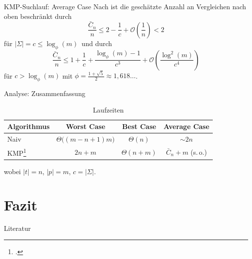 \documentclass[xcolor=dvipsnames, aspectratio=169]{beamer}
\begin{document}
\begin{frame}{KMP-Suchlauf: Average Case}
Nach \cite{baeza1989} ist die geschätzte Anzahl an Vergleichen nach oben beschränkt durch
\[\frac{\bar{C}_n}{n}\leq 2-\frac{1}{c}+\mathcal{O}\left(\frac{1}{n}\right)<2\]
für $\vert\Sigma\vert=c\leq \log_\phi(m)$\pause\ und durch
\[\frac{\bar{C}_n}{n}\leq 1+\frac{1}{c}+\frac{\log_\phi(m)-1}{c^3}+\mathcal{O}\left(\frac{\log^2(m)}{c^4}\right)\]
für $c > \log_\phi(m)$ mit $\phi=\frac{1+\sqrt{5}}{2}\approx 1,618\dots$.
\end{frame}

\begin{frame}{Analyse: Zusammenfassung}
\begin{table}%
\begin{tabularx}{\textwidth}{lccC}
\toprule
Algorithmus&Worst Case &Best Case&Average Case\\
\midrule
Naiv						&$\Theta\big((m-n+1)m\big)$	&$\Theta(n)$	&$\sim 2n$\\[1em]
KMP\footcite{baeza1989}		&$2n+m$			&$\Theta(n+m)$			&$\bar{C}_n+m$ (s.\,o.)\\\bottomrule
\end{tabularx}
\caption{Laufzeiten}
\end{table}
\bigskip

wobei $\vert t\vert=n$, $\vert p\vert=m$, $c=\vert\Sigma\vert$.
\end{frame}

\section{Fazit}

\begin{frame}[allowframebreaks]{Literatur}
\nocite{*}
\begin{small}
\printbibliography
\end{small}

\end{frame}

\end{document}
